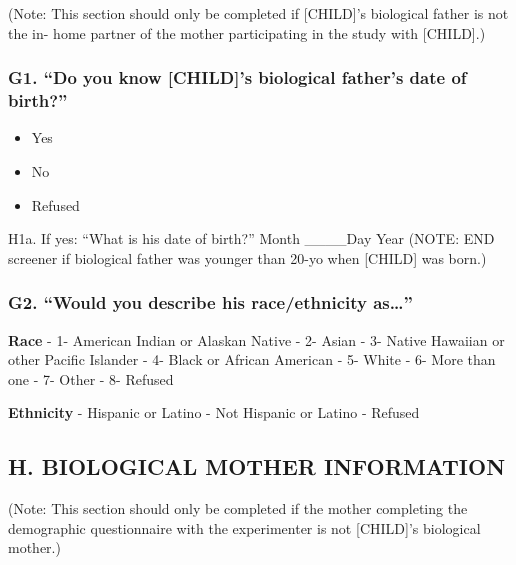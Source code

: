\documentclass[
  12pt,
]{book}
\providecommand{\tightlist}{%
  \setlength{\itemsep}{0pt}\setlength{\parskip}{0pt}}
\begin{document}
(Note: This section should only be completed if {[}CHILD{]}'s biological father is not the in- home partner of the mother participating in the study with {[}CHILD{]}.)

\hypertarget{g1.-do-you-know-childs-biological-fathers-date-of-birth}{%
\subsubsection*{G1. ``Do you know {[}CHILD{]}'s biological father's date of birth?''}\label{g1.-do-you-know-childs-biological-fathers-date-of-birth}}

\begin{itemize}
\tightlist
\item
  Yes
\item
  No
\item
  Refused
\end{itemize}

H1a. If yes: ``What is his date of birth?'' Month \_\_\_\_Day Year (NOTE: END screener if biological father was younger than 20-yo when {[}CHILD{]} was
born.)

\hypertarget{g2.-would-you-describe-his-raceethnicity-as}{%
\subsubsection*{\texorpdfstring{G2. ``Would you describe his race/ethnicity as\ldots{}''}{G2. ``Would you describe his race/ethnicity as\ldots''}}\label{g2.-would-you-describe-his-raceethnicity-as}}

\textbf{Race}
- 1- American Indian or Alaskan Native
- 2- Asian
- 3- Native Hawaiian or other Pacific Islander
- 4- Black or African American
- 5- White
- 6- More than one
- 7- Other
- 8- Refused

\textbf{Ethnicity}
- Hispanic or Latino
- Not Hispanic or Latino
- Refused

\hypertarget{h.-biological-mother-information}{%
\subsection*{H. BIOLOGICAL MOTHER INFORMATION}\label{h.-biological-mother-information}}

(Note: This section should only be completed if the mother completing the demographic questionnaire with the experimenter is not {[}CHILD{]}'s biological mother.)
\end{document}
